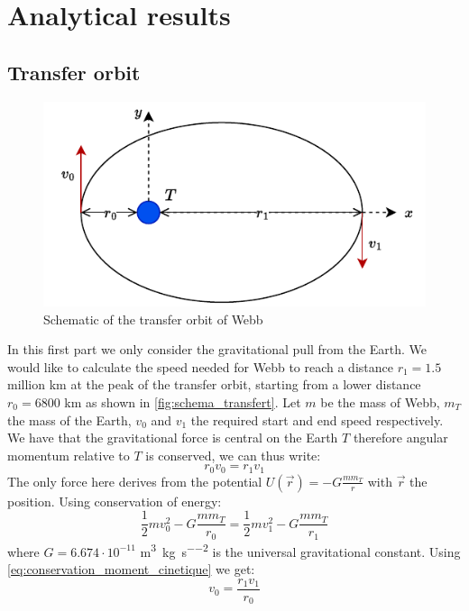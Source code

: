 \section{Analytical results}

\subsection{Transfer orbit}
\label{sec:transfer_anal}

\begin{figure}[h]
    \centering
    \includegraphics[width=0.6\linewidth]{figures/transfert.pdf}
    \caption{Schematic of the transfer orbit of Webb}
    \label{fig:schema_transfert}
\end{figure}
In this first part we only consider the gravitational pull from the Earth. We would like to calculate the speed needed for Webb to reach a distance \(r_1 = 1.5\) million km at the peak of the transfer orbit, starting from a lower distance \(r_0 = 6800\) km as shown in \autoref{fig:schema_transfert}. Let \(m\) be the mass of Webb, \(m_T\) the mass of the Earth, \(v_0\) and \(v_1\) the required start and end speed respectively. We have that the gravitational force is central on the Earth $T$ therefore angular momentum relative to $T$ is conserved, we can thus write:
\begin{equation}
    r_0 v_0 = r_1 v_1
    \label{eq:conservation_moment_cinetique}
\end{equation}
The only force here derives from the potential $U(\vec{r}) = -G \frac{m m_T}{r}$ with $\vec{r}$ the position. Using conservation of energy:
\begin{equation}
    \frac{1}{2} m v_0^2 - G \frac{m m_T}{r_0} = \frac{1}{2} m v_1^2 - G \frac{m m_T}{r_1}
    \label{eq:conservation_energy}
\end{equation}
where \(G = 6.674 \cdot 10^{-11}\) \si{\meter\cubed\per\kilo\gram\per\second\squared} is the universal gravitational constant. Using \autoref{eq:conservation_moment_cinetique} we get:
\begin{equation}
    v_0 = \frac{r_1 v_1}{r_0}
    \label{eq:v0_substitution}
\end{equation}
